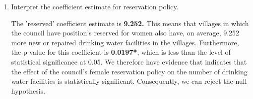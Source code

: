 \documentclass[12pt,letterpaper]{article}
\begin{document}
\begin{enumerate}
	\vspace{1cm}
	\item [(c)] Interpret the coefficient estimate for reservation policy. 
	
The 'reserved' coefficient estimate is \textbf{9.252.} This means that villages in which the council have position's reserved for women also have, on average, 9.252 more new or repaired drinking water facilities in the villages. Furthermore, the p-value for this coefficient is \textbf{0.0197*}, which is less than the level of statistical significance at 0.05. We therefore have evidence that indicates that the effect of the council's female reservation policy on the number of drinking water facilities is statistically significant. Consequently, we can reject the null hypothesis. 
\end{enumerate}
  
\end{document}
